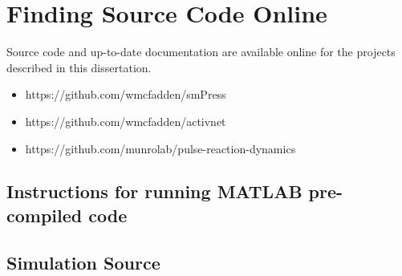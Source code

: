 \section{Finding Source Code Online}

Source code and up-to-date documentation are available online for the projects described in this dissertation.  

\begin{itemize}

\item https://github.com/wmcfadden/smPress
\item https://github.com/wmcfadden/activnet
\item https://github.com/munrolab/pulse-reaction-dynamics

\end{itemize}

\subsection{Instructions for running MATLAB pre-compiled code}

\subsection{Simulation Source}
%
%
%
%
%
%
%
%
%
%
%



